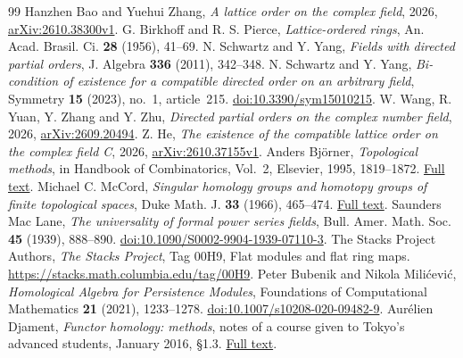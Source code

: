 \documentclass[10pt,letterpaper]{amsart}
\numberwithin{equation}{section}
\theoremstyle{definition}
\begin{document}
\begin{thebibliography}{99}
 Hanzhen Bao and Yuehui Zhang,
\emph{A lattice order on the complex field},
2026, \href{https://arxiv.org/abs/2610.38300v1}{arXiv:2610.38300v1}.
 G. Birkhoff and R. S. Pierce,
\emph{Lattice-ordered rings},
An. Acad. Brasil. Ci. \textbf{28} (1956), 41--69.
 N. Schwartz and Y. Yang,
\emph{Fields with directed partial orders},
J. Algebra \textbf{336} (2011), 342--348.
 N. Schwartz and Y. Yang,
\emph{Bi-condition of existence for a compatible directed order on an arbitrary field},
Symmetry \textbf{15} (2023), no.~1, article~215.
\href{https://doi.org/10.3390/sym15010215}{doi:10.3390/sym15010215}.
 W. Wang, R. Yuan, Y. Zhang and Y. Zhu,
\emph{Directed partial orders on the complex number field},
2026, \href{https://arxiv.org/abs/2609.20494}{arXiv:2609.20494}.
 Z. He,
\emph{The existence of the compatible lattice order on the complex field C},
2026, \href{https://arxiv.org/abs/2610.37155v1}{arXiv:2610.37155v1}.
 Anders Bj\"orner,
\emph{Topological methods}, in Handbook of Combinatorics, Vol.~2,
Elsevier, 1995, 1819--1872.
\href{https://webhomes.maths.ed.ac.uk/~v1ranick/papers/bjorner2.pdf}{Full text}.
 Michael C. McCord,
\emph{Singular homology groups and homotopy groups of finite topological spaces},
Duke Math. J. \textbf{33} (1966), 465--474.
\href{https://webhomes.maths.ed.ac.uk/~v1ranick/papers/mccord1.pdf}{Full text}.
 Saunders Mac Lane,
\emph{The universality of formal power series fields},
Bull. Amer. Math. Soc. \textbf{45} (1939), 888--890.
\href{https://doi.org/10.1090/S0002-9904-1939-07110-3}{doi:10.1090/S0002-9904-1939-07110-3}.
 The Stacks Project Authors,
\emph{The Stacks Project}, Tag 00H9, Flat modules and flat ring maps.
\url{https://stacks.math.columbia.edu/tag/00H9}.
 Peter Bubenik and Nikola Mili\'cevi\'c,
\emph{Homological Algebra for Persistence Modules},
Foundations of Computational Mathematics \textbf{21} (2021), 1233--1278.
\href{https://doi.org/10.1007/s10208-020-09482-9}{doi:10.1007/s10208-020-09482-9}.
 Aur\'elien Djament,
\emph{Functor homology: methods},
notes of a course given to Tokyo's advanced students, January 2016, \S1.3.
\href{https://djament.perso.math.cnrs.fr/course-tokyoI3-2.pdf}{Full text}.
\end{thebibliography}
\end{document}
